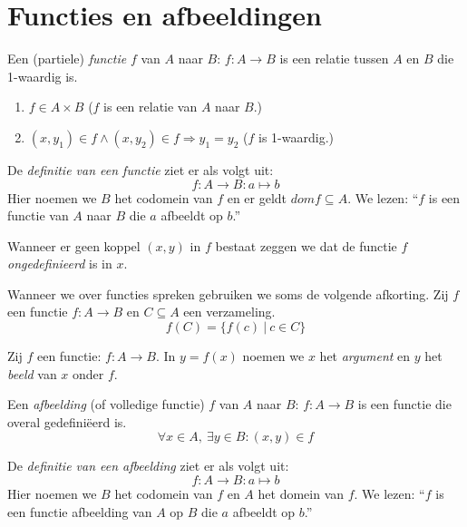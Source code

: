 \documentclass[main.tex]{subfiles}
\begin{document}
\chapter{Functies en afbeeldingen}
\label{cha:functies-en-afbeeldingen}

\begin{de}
  Een (partiele) \emph{functie} $f$ van $A$ naar $B$: $f: A \rightarrow B$ is een relatie tussen $A$ en $B$ die 1-waardig is.
  \begin{enumerate}
  \item $f \in A \times B$ ($f$ is een relatie van $A$ naar $B$.)
  \item $(x,y_{1}) \in f \wedge (x,y_{2}) \in f \Rightarrow y_{1} = y_{2}$ ($f$ is 1-waardig.)
  \end{enumerate}
\end{de}

\begin{de}
  De \emph{definitie van een functie} ziet er als volgt uit:
  \[ f: A \rightarrow B: a \mapsto b \]
  Hier noemen we $B$ het codomein van $f$ en er geldt $dom f \subseteq A$.
  We lezen: ``$f$ is een functie van $A$ naar $B$ die $a$ afbeeldt op $b$.''
\end{de}

\begin{de}
  Wanneer er geen koppel $(x,y)$ in $f$ bestaat zeggen we dat de functie $f$ \emph{ongedefinieerd} is in $x$.
\end{de}

\begin{de}
  Wanneer we over functies spreken gebruiken we soms de volgende afkorting. Zij $f$ een functie $f: A \rightarrow B$ en $C \subseteq A$ een verzameling.
  \[ f(C) = \{ f(c)\ |\ c \in C \} \] 
\end{de}

\begin{de}
  Zij $f$ een functie: $f: A \rightarrow B$. 
  In $y = f(x)$ noemen we $x$ het \emph{argument} en $y$ het \emph{beeld} van $x$ onder $f$.
\end{de}

\begin{de}
  Een \emph{afbeelding} (of volledige functie) $f$ van $A$ naar $B$: $f: A \rightarrow B$ is een functie die overal gedefini\"eerd is.
  \[ \forall x \in A,\ \exists y \in B: (x,y) \in f \]
\end{de} 
 
\begin{de}
  De \emph{definitie van een afbeelding} ziet er als volgt uit:
  \[ f: A \rightarrow B: a \mapsto b \]
  Hier noemen we $B$ het codomein van $f$ en $A$ het domein van $f$.
  We lezen: ``$f$ is een functie afbeelding van $A$ op $B$ die $a$ afbeeldt op $b$.''
\end{de} 
 
\end{document}
